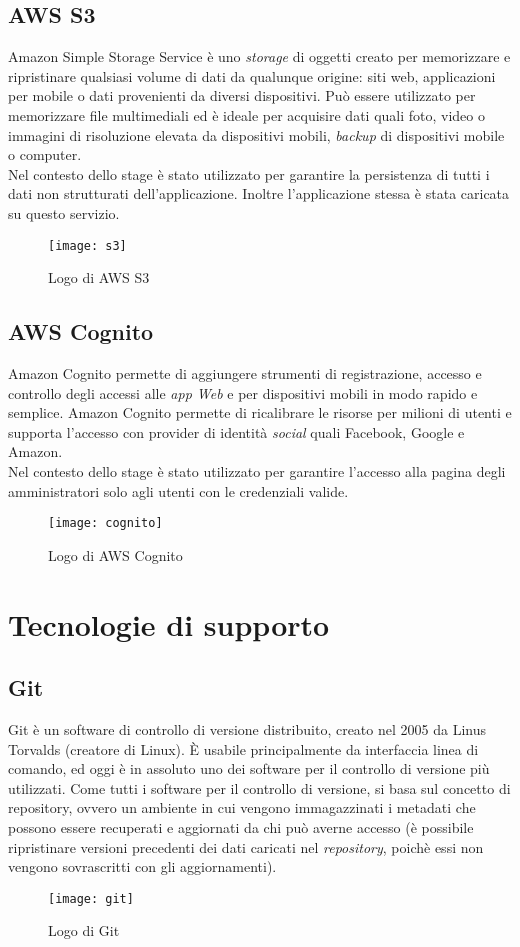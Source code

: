 \subsection{AWS S3} 
Amazon Simple Storage Service è uno \emph{storage} di
oggetti creato per memorizzare e ripristinare qualsiasi volume di dati da qualunque
origine: siti web, applicazioni per mobile o dati provenienti da diversi dispositivi. Può
essere utilizzato per memorizzare file multimediali ed è ideale per acquisire dati quali
foto, video o immagini di risoluzione elevata da dispositivi mobili, \emph{backup} di dispositivi
mobile o computer.
\\

Nel contesto dello stage è stato utilizzato per garantire la persistenza di tutti i dati
non strutturati dell’applicazione. Inoltre l'applicazione stessa è stata caricata su questo servizio.   
\begin{figure}[!h] 
	\centering 
	\texttt{[image: s3]}
	\caption{Logo di AWS S3}
\end{figure}

\subsection{AWS Cognito} 
Amazon Cognito permette di aggiungere strumenti di registrazione, accesso e controllo degli accessi alle \emph{app Web} e per dispositivi mobili in modo rapido e semplice. Amazon Cognito permette di ricalibrare le risorse per milioni di utenti e supporta l'accesso con provider di identità \emph{social} quali Facebook, Google e Amazon. 
\\

Nel contesto dello stage è stato utilizzato per garantire l'accesso alla pagina degli amministratori solo agli utenti con le credenziali valide.   
\begin{figure}[!h] 
	\centering 
	\texttt{[image: cognito]}
	\caption{Logo di AWS Cognito}
\end{figure}\newpage
\section{Tecnologie di supporto}
\subsection{Git}
Git è un software di controllo di versione distribuito, creato nel 2005 da Linus
Torvalds (creatore di Linux). È usabile principalmente da interfaccia linea di comando,
ed oggi è in assoluto uno dei software per il controllo di versione più utilizzati. Come
tutti i software per il controllo di versione, si basa sul concetto di \gls{repository}, ovvero
un ambiente in cui vengono immagazzinati i metadati che possono essere recuperati e
aggiornati da chi può averne accesso (è possibile ripristinare versioni precedenti dei
dati caricati nel \emph{repository}, poichè essi non vengono sovrascritti con gli aggiornamenti).
\begin{figure}[!h] 
	\centering 
	\texttt{[image: git]}
	\caption{Logo di Git}
\end{figure}

